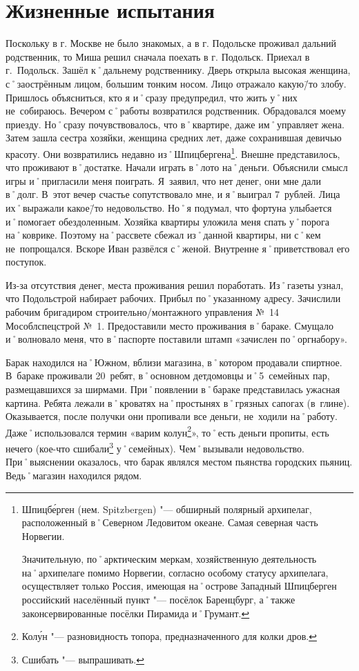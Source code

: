 ﻿\chapter{Жизненные испытания}

Поскольку в г. Москве не было знакомых, а в г. Подольске проживал дальний родственник, то Миша решил сначала поехать в г. Подольск. Приехал в г.~Подольск. Зашёл к˚дальнему родственнику. Дверь открыла высокая женщина, с˚заострённым лицом, большим тонким носом. Лицо отражало какую\=/то злобу. Пришлось объясниться, кто я и˚сразу предупредил, что жить у˚них не~собираюсь. Вечером с˚работы возвратился родственник. Обрадовался моему приезду. Но˚сразу почувствовалось, что в˚квартире, даже им˚управляет жена. Затем зашла сестра хозяйки, женщина средних лет, даже сохранившая девичью красоту. Они возвратились недавно из˚Шпицбергена\footnote{Шпицб\'{е}рген (нем. Spitzbergen) "--- обширный полярный архипелаг, расположенный в˚Северном Ледовитом океане. Самая северная часть Норвегии. 

Значительную, по˚арктическим меркам, хозяйственную деятельность на˚архипелаге помимо Норвегии, согласно особому статусу архипелага, осуществляет только Россия, имеющая на˚острове Западный Шпицберген российский населённый пункт "--- посёлок Баренцбург, а˚также законсервированные посёлки Пирамида и˚Грумант.}. 
Внешне представилось, что проживают в˚достатке. Начали играть в˚лото на˚деньги. Объяснили смысл игры и˚пригласили меня поиграть. Я~заявил, что нет денег, они мне дали в˚долг. В~этот вечер счастье сопутствовало мне, и я˚выиграл 7~рублей. Лица их˚выражали какое\=/то недовольство. Но˚я подумал, что фортуна улыбается и˚помогает обездоленным. Хозяйка квартиры уложила меня спать у˚порога на˚коврике. Поэтому на˚рассвете сбежал из˚данной квартиры, ни с˚кем не~попрощался. Вскоре Иван развёлся с˚женой. Внутренне я˚приветствовал его поступок.

Из-за отсутствия денег, места проживания решил поработать. Из˚газеты узнал, что Подольстрой набирает рабочих. Прибыл по˚указанному адресу. Зачислили рабочим бригадиром строительно\-/монтажного управления №~14 Мособлспецстрой №~1. Предоставили место проживания в˚бараке. Смущало и˚волновало меня, что в˚паспорте поставили штамп «зачислен по˚оргнабору». 

Барак находился на˚Южном, вблизи магазина, в˚котором продавали спиртное. В~бараке проживали 20~ребят, в˚основном детдомовцы и˚5~семейных пар, размещавшихся за ширмами. При˚появлении в˚бараке представилась ужасная картина. Ребята лежали в˚кроватях на˚простынях в˚грязных сапогах (в~глине). Оказывается, после получки они пропивали все деньги, не~ходили на˚работу. Даже˚использовался термин «варим колун\footnote{Кол\'{у}н "--- разновидность топора, предназначенного для колки дров.}», то˚есть деньги пропиты, есть нечего (кое-что сшибали\footnote{Сшибать "--- выпрашивать.} у˚семейных). Чем˚вызывали недовольство. При˚выяснении оказалось, что барак являлся местом пьянства городских пьяниц. Ведь˚магазин находился рядом. 

